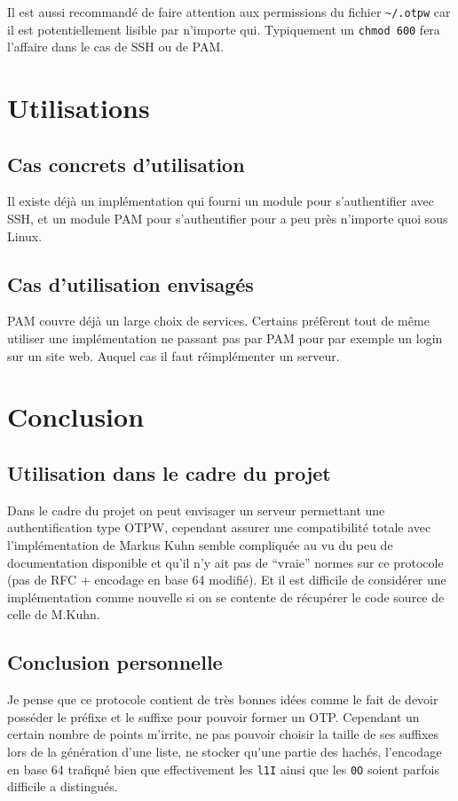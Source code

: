 \documentclass{../res/univ-projet}
\begin{document}
        Il est aussi recommandé de faire attention aux permissions du fichier \verb?~/.otpw? car
    il est potentiellement lisible par n'importe qui. Typiquement un \verb?chmod 600? fera l'affaire
    dans le cas de SSH ou de PAM.

\section{Utilisations}
\subsection{Cas concrets d'utilisation}
        Il existe déjà un implémentation qui fourni un module pour s'authentifier avec SSH, et un module
    PAM pour s'authentifier pour a peu près n'importe quoi sous Linux.

\subsection{Cas d'utilisation envisagés}
        PAM couvre déjà un large choix de services. Certains préfèrent tout de même utiliser une implémentation
    ne passant pas par PAM pour par exemple un login sur un site web. Auquel cas il faut réimplémenter un serveur.

\section{Conclusion}
\subsection{Utilisation dans le cadre du projet}
        Dans le cadre du projet on peut envisager un serveur permettant une authentification type OTPW, cependant
    assurer une compatibilité totale avec l'implémentation de Markus Kuhn semble compliquée au vu du peu de documentation
    disponible et qu'il n'y ait pas de ``vraie'' normes sur ce protocole (pas de RFC + encodage en base 64 modifié).
    Et il est difficile de considérer une implémentation comme nouvelle si on se contente de récupérer le code source
    de celle de M.Kuhn.

\subsection{Conclusion personnelle}
        Je pense que ce protocole contient de très bonnes idées comme le fait de devoir posséder le préfixe et
    le suffixe pour pouvoir former un OTP. Cependant un certain nombre de points m'irrite, ne pas pouvoir choisir la
    taille de ses suffixes lors de la génération d'une liste, ne stocker qu'une partie des hachés, l'encodage en base 64 
    trafiqué bien que effectivement les \verb?l1I? ainsi que les \verb?0O? soient parfois difficile a distingués. 
\end{document}
